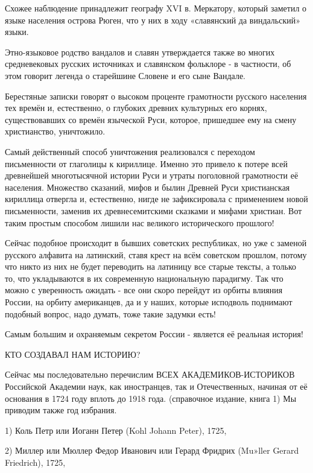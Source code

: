\begin{itemize}
Схожее наблюдение принадлежит географу XVI в. Меркатору, который заметил о
языке населения острова Рюген, что у них в ходу «славянский да виндальский»
языки.

Этно-языковое родство вандалов и славян утверждается также во многих
средневековых русских источниках и славянском фольклоре - в частности, об этом
говорит легенда о старейшине Словене и его сыне Вандале.


Берестяные записки говорят о высоком проценте грамотности русского населения
тех времён и, естественно, о глубоких древних культурных его корнях,
существовавших со времён языческой Руси, которое, пришедшее ему на смену
христианство, уничтожило.

Самый действенный способ уничтожения реализовался с переходом письменности от
глаголицы к кириллице. Именно это привело к потере всей древнейшей
многотысячной истории Руси и утраты поголовной грамотности её населения.
Множество сказаний, мифов и былин Древней Руси христианская кириллица отвергла
и, естественно, нигде не зафиксировала с применением новой письменности,
заменив их древнесемитскими сказками и мифами христиан. Вот таким простым
способом лишили нас великого исторического прошлого!

Сейчас подобное происходит в бывших советских республиках, но уже с заменой
русского алфавита на латинский, ставя крест на всём советском прошлом, потому
что никто из них не будет переводить на латиницу все старые тексты, а только
то, что укладываются в их современную национальную парадигму. Так что можно с
уверенность ожидать - все они скоро перейдут из орбиты влияния России, на
орбиту американцев, да и у наших, которые исподволь поднимают подобный вопрос,
надо думать, тоже такие задумки есть!


Самым большим и охраняемым секретом России - является её реальная история!

КТО СОЗДАВАЛ НАМ ИСТОРИЮ?

Сейчас мы последовательно перечислим ВСЕХ АКАДЕМИКОВ-ИСТОРИКОВ Российской Академии наук, как иностранцев, так и Отечественных, начиная от её основания в 1724 году вплоть до 1918 года. (справочное издание, книга 1) Мы приводим также год избрания.

1) Коль Петр или Иоганн Петер (Kohl Johann Peter), 1725,

2) Миллер или Мюллер Федор Иванович или Герард Фридрих (Mu»ller Gerard Friedrich), 1725,


\end{itemize}
